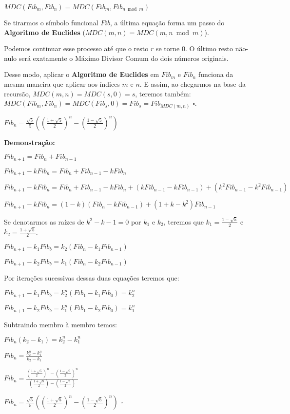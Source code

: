 $MDC(Fib_m, Fib_n) = MDC(Fib_m, Fib_{n \bmod m})$

Se tirarmos o símbolo funcional $Fib$, a última equação forma um passo do \textbf{Algoritmo de Euclides} ($MDC(m,n) = MDC(m, n \bmod m)$).

Podemos continuar esse processo até que o resto $r$ se torne $0$. O último resto não-nulo será
exatamente o Máximo Divisor Comum do dois números originais.

Desse modo, aplicar o \textbf{Algoritmo de Euclides} em $Fib_m$ e $Fib_n$ funciona da mesma maneira que aplicar aos índices $m$ e $n$.
E assim, ao chegarmos na base da recursão, $MDC(m,n) = MDC(s,0) = s$, teremos também: $MDC(Fib_m,Fib_n) = MDC(Fib_s,0) = Fib_s = Fib_{MDC(m,n)}$ $\square$.


\begin{theorem}\label{fibonacci_formula_fechada}
$Fib_n = \frac{\sqrt{5}}{5}((\frac{1+\sqrt{5}}{2})^n - (\frac{1-\sqrt{5}}{2})^n)$
\end{theorem}
\textbf{Demonstração:}

$Fib_{n+1} = Fib_n + Fib_{n-1}$

$Fib_{n+1} - kFib_n = Fib_n + Fib_{n-1} - kFib_n$

$Fib_{n+1} - kFib_n = Fib_n + Fib_{n-1} - kFib_n + (kFib_{n-1}-kFib_{n-1}) + (k^2Fib_{n-1}-k^2Fib_{n-1})$

$Fib_{n+1} - kFib_n = (1 - k)(Fib_n - kFib_{n-1}) + (1 + k - k^2)Fib_{n-1}$

Se denotarmos as raízes de $k^2-k-1=0$ por $k_1$ e $k_2$, teremos que $k_1=\frac{1-\sqrt{5}}{2}$ e $k_2=\frac{1+\sqrt{5}}{2}$. 

$Fib_{n+1} - k_1Fib_b = k_2(Fib_n - k_1Fib_{n-1})$

$Fib_{n+1} - k_2Fib_b = k_1(Fib_n - k_2Fib_{n-1})$

Por iterações sucessivas dessas duas equações teremos que:

$Fib_{n+1} - k_1Fib_b = k_2^n(Fib_1 - k_1Fib_0) = k_2^n$

$Fib_{n+1} - k_2Fib_b = k_1^n(Fib_1 - k_2Fib_0) = k_1^n$

Subtraindo membro à membro temos:

$Fib_n(k_2 - k_1) = k_2^n - k_1^n$

$Fib_n = \frac{k_2^n - k_1^n}{k_2 - k_1}$

$Fib_n = \frac{(\frac{1+\sqrt{5}}{2})^n - (\frac{1-\sqrt{5}}{2})^n}{(\frac{1+\sqrt{5}}{2}) - (\frac{1-\sqrt{5}}{2})}$

$Fib_n = \frac{\sqrt{5}}{5}((\frac{1+\sqrt{5}}{2})^n - (\frac{1-\sqrt{5}}{2})^n)$ $\square$



